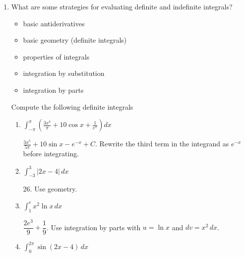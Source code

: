 \documentclass{article}
\begin{document}
\begin{enumerate}
  
\item What are some strategies for evaluating definite and indefinite integrals?
\probonly{\vfill}

\begin{solution}
\begin{itemize}
    \item basic antiderivatives
    \item basic geometry (definite integrals)
    \item properties of integrals
    \item integration by substitution
    \item integration by parts
\end{itemize}
\end{solution}

\probonly{\newpage}

Compute the following definite integrals 

  \begin{enumerate}
      \item $\displaystyle \int_{-\pi}^\pi \left( \frac{3x^4 }{\pi} + 10\cos x +
      \frac{1}{e^x} \right) dx$
      
      \begin{solution}
        $\displaystyle \frac{3x^5}{5 \pi} + 10 \sin x - e^{-x} + C$.  Rewrite the third term in the integrand as $e^{-x}$ before integrating.  
    \end{solution}
    \probonly{\vfill}
  
  \item

  $\displaystyle \int_{-3}^{3} | 2x - 4| \, dx$

  \begin{solution}
    26.  Use geometry.
  \end{solution}
  \probonly{\vfill}


\item 

  $\displaystyle\int_1^{e} x^2\ln x \, dx$

  \begin{solution}
    $\dfrac{2e^3}{9}+\dfrac{1}{9}$. Use integration by parts with $u=\ln x$ and $dv = x^2\, dx$.
  \end{solution}
  \probonly{\vfill}

\item

  \begin{problem}
    $\displaystyle \int_0^{2\pi} \sin(2x - 4)\,dx$      
  \end{problem}


\end{enumerate}
\end{enumerate}
\end{document}
